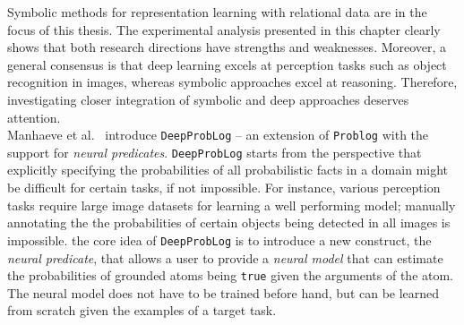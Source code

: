 \begin{tcolorbox}[enhanced,attach boxed title to top center={yshift=-3mm,yshifttext=-1mm}, colback=blue!5!white, colframe=blue!75!black, colbacktitle=white, coltitle=red!25!black,
title=Intermezzo: DeepProbLog,fonttitle=\bfseries, boxed title style={size=small,colframe=blue!75!black} ]

	Symbolic methods for representation learning with relational data are in the focus of this thesis.
	The experimental analysis presented in this chapter clearly shows that both research directions have strengths and weaknesses.
	Moreover, a general consensus is that deep learning excels at perception tasks such as object recognition in images, whereas symbolic approaches excel at reasoning.
	Therefore, investigating closer integration of symbolic and deep approaches deserves attention. \\


	Manhaeve et al.~\cite{DBLP:journals/corr/abs-1805-10872} introduce \texttt{DeepProbLog} -- an extension of \texttt{Problog} with the support for \textit{neural predicates}.
	\texttt{DeepProbLog} starts from the perspective that explicitly specifying the probabilities of all probabilistic facts in a domain might be difficult for certain tasks, if not impossible.
	For instance, various perception tasks require large image datasets for learning a well performing model; manually annotating the the probabilities of certain objects being detected in all images is impossible.
	the core idea of \texttt{DeepProbLog} is to introduce a new construct, the \textit{neural predicate}, that allows a user to provide a \textit{neural model} that can estimate the probabilities of grounded atoms being \texttt{true} given the arguments of the atom.
	The neural model does not have to be trained before hand, but can be learned from scratch given the examples of a target task. \\



\end{tcolorbox}
